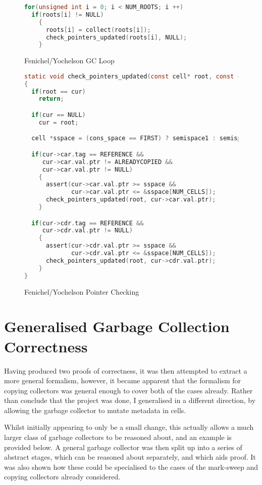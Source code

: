 \begin{figure}[H]
  \begin{lstlisting}[language=C]
for(unsigned int i = 0; i < NUM_ROOTS; i ++)
  if(roots[i] != NULL)
    {
      roots[i] = collect(roots[i]);
      check_pointers_updated(roots[i], NULL);
    }
  \end{lstlisting}
  \captionsetup{format=default}
  \caption{Fenichel/Yochelson GC Loop}
\end{figure}

\begin{figure}[H]
  \begin{lstlisting}[language=C]
static void check_pointers_updated(const cell* root, const cell* cur)
{
  if(root == cur)
    return;

  if(cur == NULL)
    cur = root;

  cell *sspace = (cons_space == FIRST) ? semispace1 : semispace2;

  if(cur->car.tag == REFERENCE &&
     cur->car.val.ptr != ALREADYCOPIED &&
     cur->car.val.ptr != NULL)
    {
      assert(cur->car.val.ptr >= sspace &&
             cur->car.val.ptr <= &sspace[NUM_CELLS]);
      check_pointers_updated(root, cur->car.val.ptr);
    }

  if(cur->cdr.tag == REFERENCE &&
     cur->cdr.val.ptr != NULL)
    {
      assert(cur->cdr.val.ptr >= sspace &&
             cur->cdr.val.ptr <= &sspace[NUM_CELLS]);
      check_pointers_updated(root, cur->cdr.val.ptr);
    }
}
  \end{lstlisting}
  \captionsetup{format=default}
  \caption{Fenichel/Yochelson Pointer Checking}
\end{figure}

\section{Generalised Garbage Collection Correctness}
\label{sec:results-correctness}

Having produced two proofs of correctness, it was then attempted to
extract a more general formalism, however, it became apparent that the
formalism for copying collectors was general enough to cover both of
the cases already. Rather than conclude that the project was done, I
generalised in a different direction, by allowing the garbage
collector to mutate metadata in cells.

Whilst initially appearing to only be a small change, this actually
allows a much larger class of garbage collectors to be reasoned about,
and an example is provided below. A general garbage collector was then
split up into a series of abstract stages, which can be reasoned about
separately, and which aids proof. It was also shown how these could be
specialised to the cases of the mark-sweep and copying collectors
already considered.

